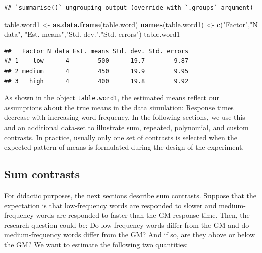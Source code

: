 \documentclass[12pt,]{krantz}
\newenvironment{Shaded}{\begin{snugshade}}{\end{snugshade}}
\newcommand{\KeywordTok}[1]{\textcolor[rgb]{0.13,0.29,0.53}{\textbf{#1}}}
\newcommand{\StringTok}[1]{\textcolor[rgb]{0.31,0.60,0.02}{#1}}
\newcommand{\NormalTok}[1]{#1}
\theoremstyle{definition}
\theoremstyle{definition}
\theoremstyle{definition}
\theoremstyle{remark}
\begin{document}
\begin{verbatim}
## `summarise()` ungrouping output (override with `.groups` argument)
\end{verbatim}

\begin{Shaded}
\begin{Highlighting}[]
\NormalTok{table.word1 <-}\StringTok{ }\KeywordTok{as.data.frame}\NormalTok{(table.word)}
\KeywordTok{names}\NormalTok{(table.word1) <-}\StringTok{ }\KeywordTok{c}\NormalTok{(}\StringTok{"Factor"}\NormalTok{,}\StringTok{"N data"}\NormalTok{,}
                        \StringTok{"Est. means"}\NormalTok{,}\StringTok{"Std. dev."}\NormalTok{,}\StringTok{"Std. errors"}\NormalTok{)}
\NormalTok{table.word1}
\end{Highlighting}
\end{Shaded}

\begin{verbatim}
##   Factor N data Est. means Std. dev. Std. errors
## 1    low      4        500      19.7        9.87
## 2 medium      4        450      19.9        9.95
## 3   high      4        400      19.8        9.92
\end{verbatim}

As shown in the object \texttt{table.word1}, the estimated means reflect
our assumptions about the true means in the data simulation: Response
times decrease with increasing word frequency. In the following
sections, we use this and an additional data-set to illustrate
\protect\hyperlink{sumcontrasts}{sum},
\protect\hyperlink{repeatedcontrasts}{repeated},
\protect\hyperlink{polynomialContrasts}{polynomial}, and
\protect\hyperlink{customContrasts}{custom} contrasts. In practice,
usually only one set of contrasts is selected when the expected pattern
of means is formulated during the design of the experiment.

\hypertarget{sumcontrasts}{\subsection{Sum
contrasts}\label{sumcontrasts}}

For didactic purposes, the next sections describe sum contrasts. Suppose
that the expectation is that low-frequency words are responded to slower
and medium-frequency words are responded to faster than the GM response
time. Then, the research question could be: Do low-frequency words
differ from the GM and do medium-frequency words differ from the GM? And
if so, are they above or below the GM? We want to estimate the following
two quantities:
\end{document}
